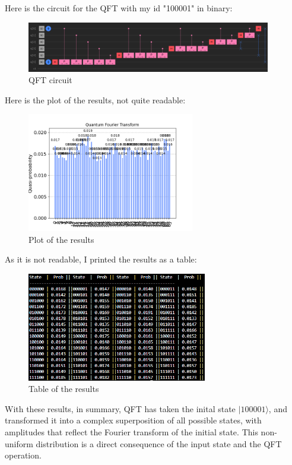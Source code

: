 \documentclass[12pt]{article}
\begin{document}
\subsection*{}

Here is the circuit for the QFT with my id "100001" in binary:

\begin{figure}[H]
    \centering
    \includegraphics[width=0.95\textwidth]{qft_circ.png}
    \caption{QFT circuit}
\end{figure}

\newpage

Here is the plot of the results, not quite readable:

\begin{figure}[H]
    \centering
    \includegraphics[width=0.65\textwidth]{qft_dist.png}
    \caption{Plot of the results}
\end{figure}

As it is not readable, I printed the results as a table:

\begin{figure}[H]
    \centering
    \includegraphics[width=0.7\textwidth]{qft_table.png}
    \caption{Table of the results}
\end{figure}

With these results, in summary, QFT has taken the inital state $ |100001\rangle $, and transformed it into a complex superposition of all possible states, with amplitudes that reflect the Fourier transform of the initial state. This non-uniform distribution is a direct consequence of the input state and the QFT operation.
\end{document}
